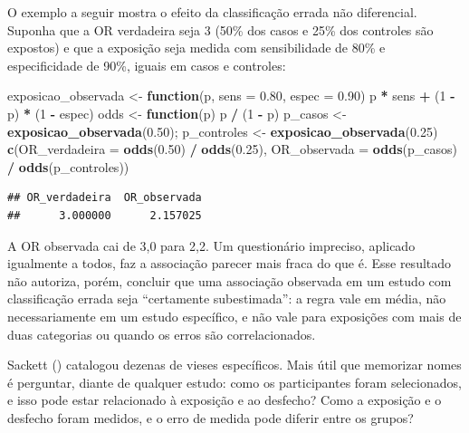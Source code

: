 \documentclass[
]{book}
\newenvironment{Shaded}{\begin{snugshade}}{\end{snugshade}}
\newcommand{\AttributeTok}[1]{\textcolor[rgb]{0.13,0.29,0.53}{#1}}
\newcommand{\ControlFlowTok}[1]{\textcolor[rgb]{0.13,0.29,0.53}{\textbf{#1}}}
\newcommand{\DecValTok}[1]{\textcolor[rgb]{0.00,0.00,0.81}{#1}}
\newcommand{\FloatTok}[1]{\textcolor[rgb]{0.00,0.00,0.81}{#1}}
\newcommand{\FunctionTok}[1]{\textcolor[rgb]{0.13,0.29,0.53}{\textbf{#1}}}
\newcommand{\NormalTok}[1]{#1}
\newcommand{\OtherTok}[1]{\textcolor[rgb]{0.56,0.35,0.01}{#1}}
\newcommand{\SpecialCharTok}[1]{\textcolor[rgb]{0.81,0.36,0.00}{\textbf{#1}}}
\begin{document}
O exemplo a seguir mostra o efeito da classificação errada não diferencial. Suponha que a OR verdadeira seja 3 (50\% dos casos e 25\% dos controles são expostos) e que a exposição seja medida com sensibilidade de 80\% e especificidade de 90\%, iguais em casos e controles:

\begin{Shaded}
\begin{Highlighting}[]
\NormalTok{exposicao\_observada }\OtherTok{\textless{}{-}} \ControlFlowTok{function}\NormalTok{(p, }\AttributeTok{sens =} \FloatTok{0.80}\NormalTok{, }\AttributeTok{espec =} \FloatTok{0.90}\NormalTok{) p }\SpecialCharTok{*}\NormalTok{ sens }\SpecialCharTok{+}\NormalTok{ (}\DecValTok{1} \SpecialCharTok{{-}}\NormalTok{ p) }\SpecialCharTok{*}\NormalTok{ (}\DecValTok{1} \SpecialCharTok{{-}}\NormalTok{ espec)}
\NormalTok{odds }\OtherTok{\textless{}{-}} \ControlFlowTok{function}\NormalTok{(p) p }\SpecialCharTok{/}\NormalTok{ (}\DecValTok{1} \SpecialCharTok{{-}}\NormalTok{ p)}
\NormalTok{p\_casos }\OtherTok{\textless{}{-}} \FunctionTok{exposicao\_observada}\NormalTok{(}\FloatTok{0.50}\NormalTok{); p\_controles }\OtherTok{\textless{}{-}} \FunctionTok{exposicao\_observada}\NormalTok{(}\FloatTok{0.25}\NormalTok{)}
\FunctionTok{c}\NormalTok{(}\AttributeTok{OR\_verdadeira =} \FunctionTok{odds}\NormalTok{(}\FloatTok{0.50}\NormalTok{) }\SpecialCharTok{/} \FunctionTok{odds}\NormalTok{(}\FloatTok{0.25}\NormalTok{), }\AttributeTok{OR\_observada =} \FunctionTok{odds}\NormalTok{(p\_casos) }\SpecialCharTok{/} \FunctionTok{odds}\NormalTok{(p\_controles))}
\end{Highlighting}
\end{Shaded}

\begin{verbatim}
## OR_verdadeira  OR_observada 
##      3.000000      2.157025
\end{verbatim}

A OR observada cai de 3,0 para 2,2. Um questionário impreciso, aplicado igualmente a todos, faz a associação parecer mais fraca do que é. Esse resultado não autoriza, porém, concluir que uma associação observada em um estudo com classificação errada seja ``certamente subestimada'': a regra vale em média, não necessariamente em um estudo específico, e não vale para exposições com mais de duas categorias ou quando os erros são correlacionados.

Sackett () catalogou dezenas de vieses específicos. Mais útil que memorizar nomes é perguntar, diante de qualquer estudo: como os participantes foram selecionados, e isso pode estar relacionado à exposição e ao desfecho? Como a exposição e o desfecho foram medidos, e o erro de medida pode diferir entre os grupos?
\end{document}
